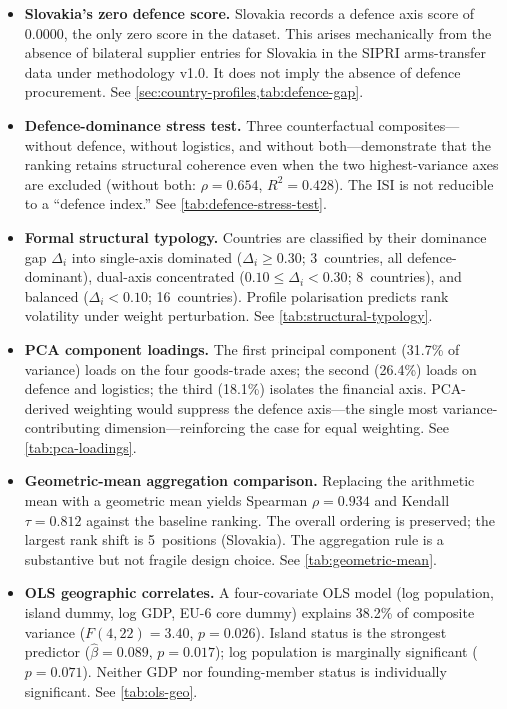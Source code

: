 \begin{itemize}[leftmargin=2em]
\item \textbf{Slovakia's zero defence score.}
  Slovakia records a defence axis score of \num{0.0000}, the
  only zero score in the dataset.  This arises mechanically from
  the absence of bilateral supplier entries for Slovakia in the
  SIPRI arms-transfer data under methodology v1.0.  It does not
  imply the absence of defence procurement.
  See \cref{sec:country-profiles,tab:defence-gap}.

\item \textbf{Defence-dominance stress test.}
  Three counterfactual composites---without defence, without
  logistics, and without both---demonstrate that the ranking
  retains structural coherence even when the two highest-variance
  axes are excluded (without both: $\rho = 0.654$, $R^2 = 0.428$).
  The ISI is not reducible to a ``defence index.''
  See \cref{tab:defence-stress-test}.

\item \textbf{Formal structural typology.}
  Countries are classified by their dominance gap $\Delta_i$
  into single-axis dominated ($\Delta_i \geq 0.30$; 3~countries,
  all defence-dominant), dual-axis concentrated
  ($0.10 \leq \Delta_i < 0.30$; 8~countries), and balanced
  ($\Delta_i < 0.10$; 16~countries).  Profile polarisation
  predicts rank volatility under weight perturbation.
  See \cref{tab:structural-typology}.

\item \textbf{PCA component loadings.}
  The first principal component (31.7\% of variance) loads on the
  four goods-trade axes; the second (26.4\%) loads on defence and
  logistics; the third (18.1\%) isolates the financial axis.
  PCA-derived weighting would suppress the defence axis---the
  single most variance-contributing dimension---reinforcing the
  case for equal weighting.
  See \cref{tab:pca-loadings}.

\item \textbf{Geometric-mean aggregation comparison.}
  Replacing the arithmetic mean with a geometric mean yields
  Spearman $\rho = 0.934$ and Kendall $\tau = 0.812$ against the
  baseline ranking.  The overall ordering is preserved; the largest
  rank shift is 5~positions (Slovakia).  The aggregation rule is a
  substantive but not fragile design choice.
  See \cref{tab:geometric-mean}.

\item \textbf{OLS geographic correlates.}
  A four-covariate OLS model (log population, island dummy, log GDP,
  EU-6 core dummy) explains 38.2\% of composite variance
  ($F(4,22) = 3.40$, $p = 0.026$).  Island status is the strongest
  predictor ($\hat{\beta} = 0.089$, $p = 0.017$); log population
  is marginally significant ($p = 0.071$).  Neither GDP nor
  founding-member status is individually significant.
  See \cref{tab:ols-geo}.

\end{itemize}
